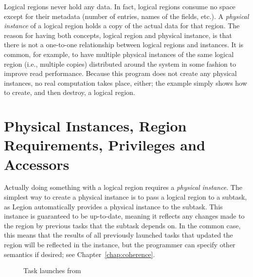 Logical regions never hold any data.  In
fact, logical regions consume no space except for their metadata
(number of entries, names of the fields, etc.).  A {\em physical
  instance} of a logical region holds a copy of the actual data for
that region.  The reason for having both concepts, logical region and
physical instance, is that there is not a one-to-one relationship
between logical regions and instances.  It is common, for example, to
have multiple physical instances of the same logical region (i.e.,
multiple copies) distributed around the system in some fashion to
improve read performance.  Because this program does not create any
physical instances, no real computation takes place, either; the
example simply shows how to create, and then destroy, a logical
region.

\begin{figure}

\caption{}
\label{fig:lr1}
\end{figure}

\section{Physical Instances, Region Requirements, Privileges and Accessors}
\label{sec:privileges}

Actually doing something with a logical region requires a {\em
  physical instance}.  The simplest way to create a physical instance
is to pass a logical region to a subtask, as Legion automatically
provides a physical instance to the subtask.  This instance is
guaranteed to be up-to-date, meaning it reflects any changes made to
the region by previous tasks that the subtask depends on.  In the
common case, this means that the results of all previously launched
tasks that updated the region will be reflected in the instance, but
the programmer can specify other semantics if desired; see
Chapter~\ref{chap:coherence}.

\begin{figure}

\caption{Task launches from }
\label{fig:privileges}
\end{figure}



